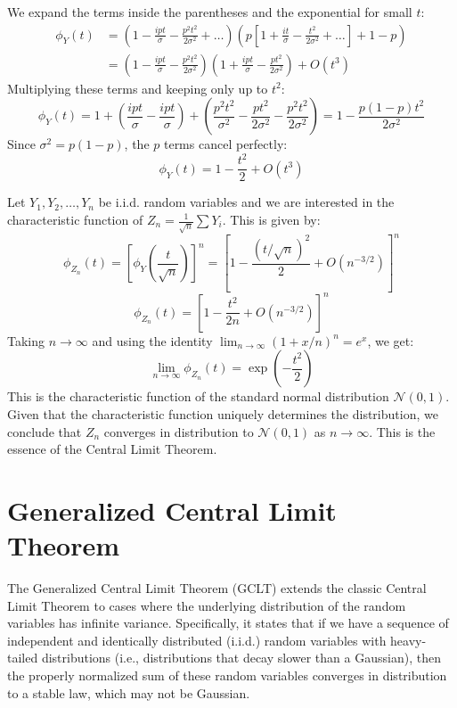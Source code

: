 \documentclass[12pt]{article}
\begin{document}
\begin{singlespace}
We expand the terms inside the parentheses and the exponential for small $t$:
\begin{align}
\phi_{Y}(t) &= \left( 1 - \frac{ipt}{\sigma} - \frac{p^2 t^2}{2\sigma^2} + \dots \right) \left( p \left[ 1 + \frac{it}{\sigma} - \frac{t^2}{2\sigma^2} + \dots \right] + 1 - p \right) \\
&= \left( 1 - \frac{ipt}{\sigma} - \frac{p^2 t^2}{2\sigma^2} \right) \left( 1 + \frac{ipt}{\sigma} - \frac{pt^2}{2\sigma^2} \right) + O(t^3)
\end{align}
Multiplying these terms and keeping only up to $t^2$:
\begin{equation}
\phi_{Y}(t) = 1 + \left( \frac{ipt}{\sigma} - \frac{ipt}{\sigma} \right) + \left( \frac{p^2 t^2}{\sigma^2} - \frac{pt^2}{2\sigma^2} - \frac{p^2 t^2}{2\sigma^2} \right) = 1 - \frac{p(1-p)t^2}{2\sigma^2}
\end{equation}
Since $\sigma^2 = p(1-p)$, the $p$ terms cancel perfectly:
\begin{equation}
\phi_{Y}(t) = 1 - \frac{t^2}{2} + O(t^3)
\end{equation}

Let $Y_1, Y_2, \dots, Y_n$ be i.i.d. random variables and we are interested in the characteristic function of $Z_n = \frac{1}{\sqrt{n}} \sum Y_i$. This is given by:
\begin{equation}
\phi_{Z_n}(t) = \left[ \phi_Y \left( \frac{t}{\sqrt{n}} \right) \right]^n = \left[ 1 - \frac{(t/\sqrt{n})^2}{2} + O(n^{-3/2}) \right]^n
\end{equation}
\begin{equation}
\phi_{Z_n}(t) = \left[ 1 - \frac{t^2}{2n} + O(n^{-3/2}) \right]^n
\end{equation}
Taking $n \to \infty$ and using the identity $\lim_{n \to \infty} (1 + x/n)^n = e^x$, we get:
\begin{equation}
\lim_{n \to \infty} \phi_{Z_n}(t) = \exp\left( -\frac{t^2}{2} \right)
\end{equation}
This is the characteristic function of the standard normal distribution $\mathcal{N}(0, 1)$. Given that the characteristic function uniquely determines the distribution, we conclude that $Z_n$ converges in distribution to $\mathcal{N}(0, 1)$ as $n \to \infty$. This is the essence of the Central Limit Theorem.

\section{Generalized Central Limit Theorem}
The Generalized Central Limit Theorem (GCLT) extends the classic Central Limit Theorem to cases where the underlying distribution of the random variables has infinite variance. Specifically, it states that if we have a sequence of independent and identically distributed (i.i.d.) random variables with heavy-tailed distributions (i.e., distributions that decay slower than a Gaussian), then the properly normalized sum of these random variables converges in distribution to a stable law, which may not be Gaussian.


\end{singlespace}
\end{document}
